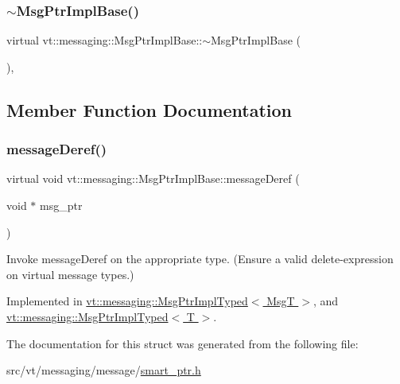\subsubsection{\texorpdfstring{$\sim$\+Msg\+Ptr\+Impl\+Base()}{~MsgPtrImplBase()}}
{\footnotesize\ttfamily virtual vt\+::messaging\+::\+Msg\+Ptr\+Impl\+Base\+::$\sim$\+Msg\+Ptr\+Impl\+Base (\begin{DoxyParamCaption}{ }\end{DoxyParamCaption})\hspace{0.3cm}{\ttfamily [inline]}, {\ttfamily [virtual]}}



\subsection{Member Function Documentation}
\mbox{\label{structvt_1_1messaging_1_1_msg_ptr_impl_base_a654574717593bf92d031c055731ef41e}} 
\subsubsection{\texorpdfstring{message\+Deref()}{messageDeref()}}
{\footnotesize\ttfamily virtual void vt\+::messaging\+::\+Msg\+Ptr\+Impl\+Base\+::message\+Deref (\begin{DoxyParamCaption}\item[{void $\ast$}]{msg\+\_\+ptr }\end{DoxyParamCaption})\hspace{0.3cm}{\ttfamily [pure virtual]}}

Invoke message\+Deref on the appropriate type. (Ensure a valid delete-\/expression on virtual message types.) 

Implemented in \hyperlink{structvt_1_1messaging_1_1_msg_ptr_impl_typed_aa56386ba3acc0fa3a827e337872a87d2}{vt\+::messaging\+::\+Msg\+Ptr\+Impl\+Typed$<$ Msg\+T $>$}, and \hyperlink{structvt_1_1messaging_1_1_msg_ptr_impl_typed_aa56386ba3acc0fa3a827e337872a87d2}{vt\+::messaging\+::\+Msg\+Ptr\+Impl\+Typed$<$ T $>$}.



The documentation for this struct was generated from the following file\+:\begin{DoxyCompactItemize}
\item 
src/vt/messaging/message/\hyperlink{smart__ptr_8h}{smart\+\_\+ptr.\+h}\end{DoxyCompactItemize}

